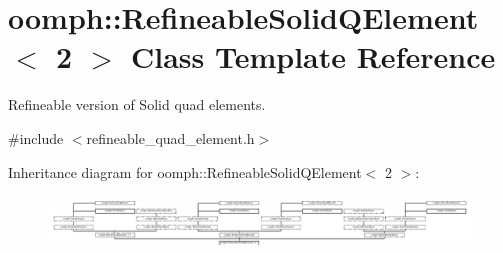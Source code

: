 \hypertarget{classoomph_1_1RefineableSolidQElement_3_012_01_4}{}\section{oomph\+:\+:Refineable\+Solid\+Q\+Element$<$ 2 $>$ Class Template Reference}
\label{classoomph_1_1RefineableSolidQElement_3_012_01_4}


Refineable version of Solid quad elements.  




{\ttfamily \#include $<$refineable\+\_\+quad\+\_\+element.\+h$>$}

Inheritance diagram for oomph\+:\+:Refineable\+Solid\+Q\+Element$<$ 2 $>$\+:\begin{figure}[H]
\begin{center}
\leavevmode
\includegraphics[height=1.423729cm]{classoomph_1_1RefineableSolidQElement_3_012_01_4}
\end{center}
\end{figure}

